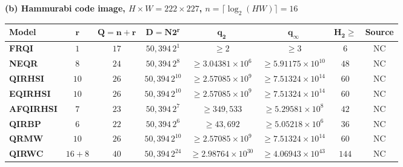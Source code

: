 \documentclass[11pt,a4paper]{article}
\begin{document}
{\begin{table}
\par\vspace{0.3cm}
\textbf{(b) Hammurabi code image, $H\times W=222\times227$, $n=\lceil\log_2(HW)\rceil=16$}\\[3pt]
{\footnotesize\setlength{\tabcolsep}{4pt}
\begin{tabular}{lccccccc}
\hline\rowcolor{Bisque3}
\textbf{Model} & $\boldsymbol{r}$ & $\boldsymbol{Q=n+r}$ & $\boldsymbol{D=N2^r}$ & $\boldsymbol{q_2}$ & $\boldsymbol{q_\infty}$ & $\boldsymbol{H_2\geq}$ & \textbf{Source}\\
\hline
\textbf{FRQI} & \(1\) & \(17\) & \(50{,}394\,2^{1}\) & $\geq 2$ & $\geq 3$ & \(6\) & NC \\
\textbf{NEQR} & \(8\) & \(24\) & \(50{,}394\,2^{8}\) & $\geq 3.04381\times10^{6}$ & $\geq 5.91175\times10^{10}$ & \(48\) & NC \\
\textbf{QIRHSI} & \(10\) & \(26\) & \(50{,}394\,2^{10}\) & $\geq 2.57085\times10^{9}$ & $\geq 7.51324\times10^{14}$ & \(60\) & NC \\
\textbf{EQIRHSI} & \(10\) & \(26\) & \(50{,}394\,2^{10}\) & $\geq 2.57085\times10^{9}$ & $\geq 7.51324\times10^{14}$ & \(60\) & NC \\
\textbf{AFQIRHSI} & \(7\) & \(23\) & \(50{,}394\,2^{7}\) & $\geq 349{,}533$ & $\geq 5.29581\times10^{8}$ & \(42\) & NC \\
\textbf{QIRBP} & \(6\) & \(22\) & \(50{,}394\,2^{6}\) & $\geq 43{,}692$ & $\geq 5.05218\times10^{6}$ & \(36\) & NC \\
\textbf{QRMW} & \(10\) & \(26\) & \(50{,}394\,2^{10}\) & $\geq 2.57085\times10^{9}$ & $\geq 7.51324\times10^{14}$ & \(60\) & NC \\
\textbf{QIRWC} & \(16+8\) & \(40\) & \(50{,}394\,2^{24}\) & $\geq 2.98764\times10^{30}$ & $\geq 4.06943\times10^{43}$ & \(144\) & NC \\
\hline\end{tabular}}\par


\end{table}}
\end{document}

